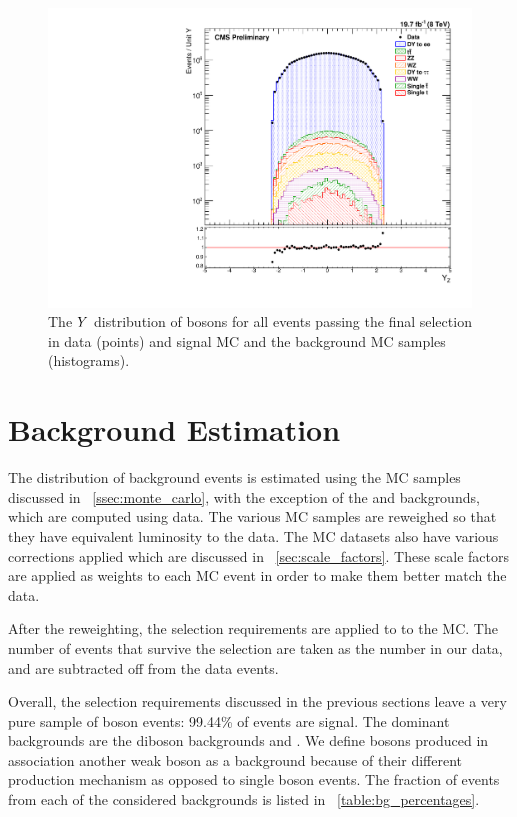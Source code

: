 \begin{figure}[!htbp]
    \centering
    \includegraphics[width=\textwidth]{figures/z_rapidity_powheg.pdf}
    \caption[
        The $\rapidity$ distribution of \Z bosons in data and MC with \POWHEG
        signal MC.
    ]{
        The $\rapidity$ distribution of \Z bosons for all events passing the
        final selection in data (points) and \POWHEG signal MC and the
        background MC samples (histograms).
    }
    \label{fig:z_rapidity_powheg}
\end{figure}

\section{Background Estimation}
\label{sec:background}

The distribution of background events is estimated using the MC samples
discussed in \SEC~\ref{ssec:monte_carlo}, with the exception of the \QCDjets
and \wjets backgrounds, which are computed using data. The various MC samples
are reweighed so that they have equivalent luminosity to the data. The MC
datasets also have various corrections applied which are discussed in
\SEC~\ref{sec:scale_factors}. These scale factors are applied as weights to
each MC event in order to make them better match the data.

After the reweighting, the selection requirements are applied to to the MC. The
number of events that survive the selection are taken as the number in our
data, and are subtracted off from the data events.

Overall, the selection requirements discussed in the previous sections leave a
very pure sample of \Z boson events: 99.44\% of events are signal. The dominant
backgrounds are the diboson backgrounds and \ttbar. We define \Z bosons
produced in association another weak boson as a background because of their
different production mechanism as opposed to single \Z boson events. The
fraction of events from each of the considered backgrounds is listed in
\TAB~\ref{table:bg_percentages}.

